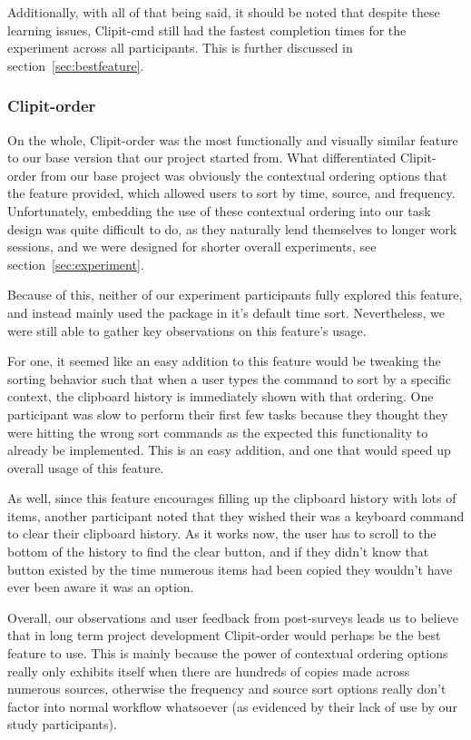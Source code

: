 \documentclass{acm_proc_article-sp}
\begin{document}
Additionally, with all of that being said, it should be noted that despite these learning issues, Clipit-cmd still had the fastest completion times for the experiment across all participants. This is further discussed in section~\ref{sec:bestfeature}.

\subsubsection{Clipit-order}

On the whole, Clipit-order was the most functionally and visually similar feature to our base version that our project started from. What differentiated Clipit-order from our base project was obviously the contextual ordering options that the feature provided, which allowed users to sort by time, source, and frequency. Unfortunately, embedding the use of these contextual ordering into our task design was quite difficult to do, as they naturally lend themselves to longer work sessions, and we were designed for shorter overall experiments, see section~\ref{sec:experiment}. 

Because of this, neither of our experiment participants fully explored this feature, and instead mainly used the package in it's default time sort. Nevertheless, we were still able to gather key observations on this feature's usage. 

For one, it seemed like an easy addition to this feature would be tweaking the sorting behavior such that when a user types the command to sort by a specific context, the clipboard history is immediately shown with that ordering. One participant was slow to perform their first few tasks because they thought they were hitting the wrong sort commands as the expected this functionality to already be implemented. This is an easy addition, and one that would speed up overall usage of this feature. 

As well, since this feature encourages filling up the clipboard history with lots of items, another participant noted that they wished their was a keyboard command to clear their clipboard history. As it works now, the user has to scroll to the bottom of the history to find the clear button, and if they didn't know that button existed by the time numerous items had been copied they wouldn't have ever been aware it was an option.

Overall, our observations and user feedback from post-surveys leads us to believe that in long term project development Clipit-order would perhaps be the best feature to use. This is mainly because the power of contextual ordering options really only exhibits itself when there are hundreds of copies made across numerous sources, otherwise the frequency and source sort options really don't factor into normal workflow whatsoever (as evidenced by their lack of use by our study participants).
\end{document}
